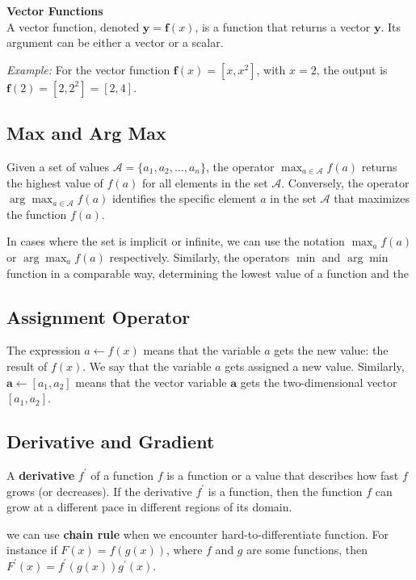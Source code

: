 \textbf{Vector Functions}\\
A vector function, denoted \( \mathbf{y} = \mathbf{f}(x) \), is a function that returns a vector \( \mathbf{y} \). Its argument can be either a vector or a scalar.

\emph{Example:} For the vector function \( \mathbf{f}(x) = [x, x^2] \), with \( x = 2 \), the output is \( \mathbf{f}(2) = [2, 2^2] = [2, 4] \).

\subsection{Max and Arg Max}

Given a set of values \( \mathcal{A} = \{a_{1}, a_{2}, \ldots, a_{n}\} \), the operator \( \max_{a \in \mathcal{A}} f(a) \) returns the highest value of \( f(a) \) for all elements in the set \( \mathcal{A} \). Conversely, the operator \( \arg \max_{a \in \mathcal{A}} f(a) \) identifies the specific element \( a \) in the set \( \mathcal{A} \) that maximizes the function \( f(a) \).

In cases where the set is implicit or infinite, we can use the notation \( \max_{a} f(a) \) or \( \arg \max_{a} f(a) \) respectively. Similarly, the operators \( \min \) and \( \arg \min \) function in a comparable way, determining the lowest value of a function and the

\subsection{Assignment Operator}
The expression \(a \leftarrow f(x)\) means that the variable \(a\) gets the new value: the result of \(f(x)\). We say that the variable \(a\) gets assigned a new value. Similarly, \(\mathbf{a} \leftarrow\left[a_{1}, a_{2}\right]\) means that the vector variable \(\mathbf{a}\) gets the two-dimensional vector \(\left[a_{1}, a_{2}\right]\).

\subsection{Derivative and Gradient}
A \textbf{derivative} \(f^{\prime}\) of a function \(f\) is a function or a value that describes how fast \(f\) grows (or decreases). If the derivative \(f^{\prime}\) is a function, then the function \(f\) can grow at a different pace in different regions of its domain.

we can use \textbf{chain rule} when we encounter hard-to-differentiate function. For instance if \(F(x)=f(g(x))\), where \(f\) and \(g\) are some functions, then \(F^{\prime}(x)= f^{\prime}(g(x)) g^{\prime}(x)\).

